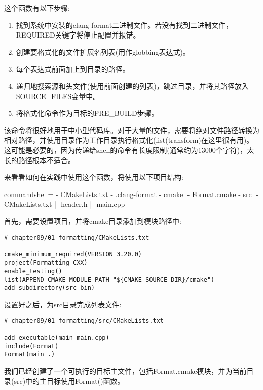 这个函数有以下步骤:

\begin{enumerate}
\item 
找到系统中安装的clang-format二进制文件。若没有找到二进制文件，REQUIRED关键字将停止配置并报错。

\item 
创建要格式化的文件扩展名列表(用作globbing表达式)。

\item 
每个表达式前面加上到目录的路径。

\item 
递归地搜索源和头文件(使用前面创建的列表)，跳过目录，并将其路径放入SOURCE\_FILES变量中。

\item 
将格式化命令作为目标的PRE\_BUILD步骤。
\end{enumerate}

该命令将很好地用于中小型代码库。对于大量的文件，需要将绝对文件路径转换为相对路径，并使用目录作为工作目录执行格式化(list(transform)在这里很有用)。这可能是必要的，因为传递给shell的命令有长度限制(通常约为13000个字符)，太长的路径根本不适合。

来看看如何在实践中使用这个函数，将使用以下项目结构:

\begin{tcblisting}{commandshell={}}
- CMakeLists.txt
- .clang-format
- cmake
    |- Format.cmake
- src
    |- CMakeLists.txt
    |- header.h
    |- main.cpp
\end{tcblisting}

首先，需要设置项目，并将cmake目录添加到模块路径中:

\begin{lstlisting}[style=styleCMake]
# chapter09/01-formatting/CMakeLists.txt

cmake_minimum_required(VERSION 3.20.0)
project(Formatting CXX)
enable_testing()
list(APPEND CMAKE_MODULE_PATH "${CMAKE_SOURCE_DIR}/cmake")
add_subdirectory(src bin)
\end{lstlisting}

设置好之后，为src目录完成列表文件:

\begin{lstlisting}[style=styleCMake]
# chapter09/01-formatting/src/CMakeLists.txt

add_executable(main main.cpp)
include(Format)
Format(main .)
\end{lstlisting}

我们已经创建了一个可执行的目标主文件，包括Format.cmake模块，并为当前目录(src)中的主目标使用Format()函数。

